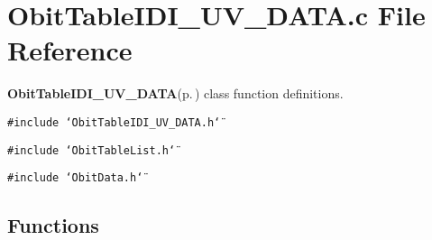 \section{Obit\-Table\-IDI\_\-UV\_\-DATA.c File Reference}
\label{ObitTableIDI__UV__DATA_8c}
{\bf Obit\-Table\-IDI\_\-UV\_\-DATA}{\rm (p.\,\pageref{structObitTableIDI__UV__DATA})} class function definitions. 

{\tt \#include \char`\"{}Obit\-Table\-IDI\_\-UV\_\-DATA.h\char`\"{}}\par
{\tt \#include \char`\"{}Obit\-Table\-List.h\char`\"{}}\par
{\tt \#include \char`\"{}Obit\-Data.h\char`\"{}}\par
\subsection*{Functions}
